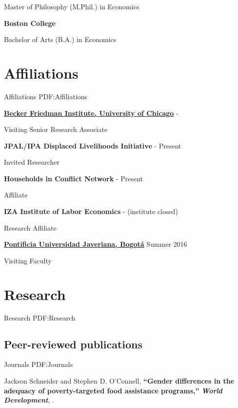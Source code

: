 \documentclass[letterpaper,10pt,oneside]{article}
\begin{document}
\begin{body}
Master of Philosophy (M.Phil.) in Economics
\hfill
{}

\EntryGapNoBreak
\textbf{Boston College}
\par
Bachelor of Arts (B.A.) in
Economics
\hfill
{}

\vspace*{-.2cm}
\section
{Affiliations}
{Affiliations}
{PDF:Affiliations}

\NoEntryGap
\href{https://bfi.uchicago.edu/}
{\textbf{Becker Friedman Institute, University of Chicago}}
\hfill
{} - 

Visiting Senior Research Associate


\EntryGapNoBreak
\textbf{JPAL/IPA Displaced Livelihoods Initiative}
\hfill
{} - Present

Invited Researcher


\EntryGapNoBreak
\textbf{Households in Conflict Network}
\hfill
{} - Present

Affiliate



\EntryGapNoBreak

\textbf{IZA Institute of Labor Economics}
\hfill
{} -  (institute closed)

Research Affiliate

\EntryGapNoBreak
\href{www.javeriana.edu.co}
{\textbf{Pontificia Universidad Javeriana, Bogot\'{a}}}
\hfill
Summer 2016

Visiting Faculty


\section
{Research}
{Research}
{PDF:Research}


\subsection
{Peer-reviewed publications} 
{Journals}
{PDF:Journals}

\BigEntryGapNoBreak
Jackson Schneider and Stephen D. O'Connell, \textbf{``Gender differences in the adequacy of poverty-targeted food assistance programs,''} \textbf{\textit{World Development}}, .


\end{body}
\end{document}
